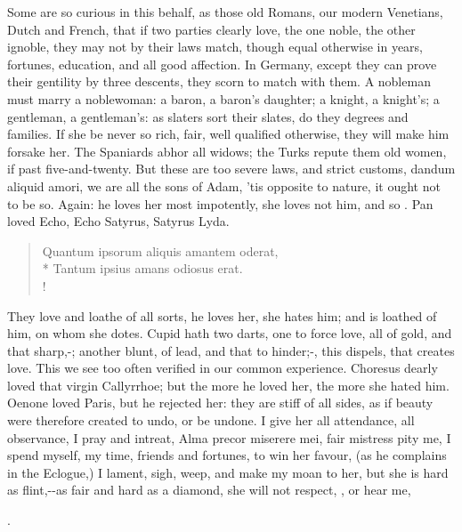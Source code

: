 Some are so curious in this behalf, as those old Romans, our modern
Venetians, Dutch and French, that if two parties clearly love, the one
noble, the other ignoble, they may not by their laws match, though
equal otherwise in years, fortunes, education, and all good affection.
In Germany, except they can prove their gentility by three descents,
they scorn to match with them. A nobleman must marry a noblewoman: a
baron, a baron's daughter; a knight, a knight's; a gentleman, a
gentleman's: as slaters sort their slates, do they degrees and
families. If she be never so rich, fair, well qualified otherwise, they
will make him forsake her. The Spaniards abhor all widows; the Turks
repute them old women, if past five-and-twenty. But these are too
severe laws, and strict customs, dandum aliquid amori, we are all the
sons of Adam, 'tis opposite to nature, it ought not to be so. Again: he
loves her most impotently, she loves not him, and so .
Pan loved Echo, Echo Satyrus, Satyrus Lyda.
%
\begin{latin}%
\begin{verse}%
Quantum ipsorum aliquis amantem oderat,\\*
Tantum ipsius amans odiosus erat.\\!
\end{verse}%
\end{latin}%
%
They love and loathe of all sorts, he loves her, she hates him; and is
loathed of him, on whom she dotes. Cupid hath two darts, one to force
love, all of gold, and that sharp,-;
another blunt, of lead, and that to hinder;-, this dispels, that creates love. This we see too often verified
in our common experience. Choresus dearly loved that virgin
Callyrrhoe; but the more he loved her, the more she hated him. Oenone
loved Paris, but he rejected her: they are stiff of all sides, as if
beauty were therefore created to undo, or be undone. I give her all
attendance, all observance, I pray and intreat, Alma precor
miserere mei, fair mistress pity me, I spend myself, my time, friends
and fortunes, to win her favour, (as he complains in the
Eclogue,) I lament, sigh, weep, and make my moan to her, but she
is hard as flint,--as fair and hard as a
diamond, she will not respect, , or hear me,

.

